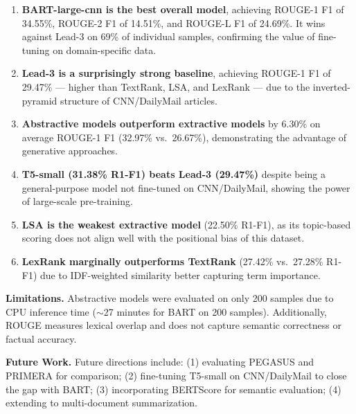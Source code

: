 \documentclass[conference]{IEEEtran}
\begin{document}
\begin{enumerate}
    \item \textbf{BART-large-cnn is the best overall model}, achieving
          ROUGE-1 F1 of 34.55\%, ROUGE-2 F1 of 14.51\%, and ROUGE-L F1
          of 24.69\%. It wins against Lead-3 on 69\% of individual
          samples, confirming the value of fine-tuning on domain-specific
          data.

    \item \textbf{Lead-3 is a surprisingly strong baseline}, achieving
          ROUGE-1 F1 of 29.47\% --- higher than TextRank, LSA, and
          LexRank --- due to the inverted-pyramid structure of
          CNN/DailyMail articles.

    \item \textbf{Abstractive models outperform extractive models} by
          6.30\% on average ROUGE-1 F1 (32.97\% vs.\ 26.67\%),
          demonstrating the advantage of generative approaches.

    \item \textbf{T5-small (31.38\% R1-F1) beats Lead-3 (29.47\%)}
          despite being a general-purpose model not fine-tuned on
          CNN/DailyMail, showing the power of large-scale pre-training.

    \item \textbf{LSA is the weakest extractive model} (22.50\% R1-F1),
          as its topic-based scoring does not align well with the
          positional bias of this dataset.

    \item \textbf{LexRank marginally outperforms TextRank} (27.42\%
          vs.\ 27.28\% R1-F1) due to IDF-weighted similarity better
          capturing term importance.
\end{enumerate}

\noindent\textbf{Limitations.}
Abstractive models were evaluated on only 200 samples due to CPU
inference time ($\sim$27 minutes for BART on 200 samples). Additionally,
ROUGE measures lexical overlap and does not capture semantic correctness
or factual accuracy.

\noindent\textbf{Future Work.}
Future directions include: (1) evaluating PEGASUS \cite{zhang2020} and
PRIMERA for comparison; (2) fine-tuning T5-small on CNN/DailyMail to
close the gap with BART; (3) incorporating BERTScore for semantic
evaluation; (4) extending to multi-document summarization.

\end{document}
